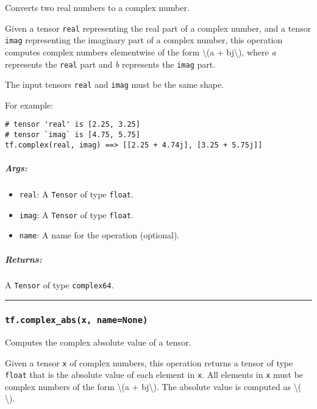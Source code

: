 Converts two real numbers to a complex number.

Given a tensor \texttt{real} representing the real part of a complex
number, and a tensor \texttt{imag} representing the imaginary part of a
complex number, this operation computes complex numbers elementwise of
the form \textbackslash{}(a + bj\textbackslash{}), where \emph{a}
represents the \texttt{real} part and \emph{b} represents the
\texttt{imag} part.

The input tensors \texttt{real} and \texttt{imag} must be the same
shape.

For example:

\begin{verbatim}
# tensor 'real' is [2.25, 3.25]
# tensor `imag` is [4.75, 5.75]
tf.complex(real, imag) ==> [[2.25 + 4.74j], [3.25 + 5.75j]]
\end{verbatim}

\subparagraph{Args: }\label{args-33}

\begin{itemize}
\tightlist
\item
  \texttt{real}: A \texttt{Tensor} of type \texttt{float}.
\item
  \texttt{imag}: A \texttt{Tensor} of type \texttt{float}.
\item
  \texttt{name}: A name for the operation (optional).
\end{itemize}

\subparagraph{Returns: }\label{returns-33}

A \texttt{Tensor} of type \texttt{complex64}.

\begin{center}\rule{0.5\linewidth}{\linethickness}\end{center}

\subsubsection{\texorpdfstring{\texttt{tf.complex\_abs(x,\ name=None)}
}{tf.complex\_abs(x, name=None) }}\label{tf.complexux5fabsx-namenone}

Computes the complex absolute value of a tensor.

Given a tensor \texttt{x} of complex numbers, this operation returns a
tensor of type \texttt{float} that is the absolute value of each element
in \texttt{x}. All elements in \texttt{x} must be complex numbers of the
form \textbackslash{}(a + bj\textbackslash{}). The absolute value is
computed as \textbackslash{}( \textbackslash{}).

